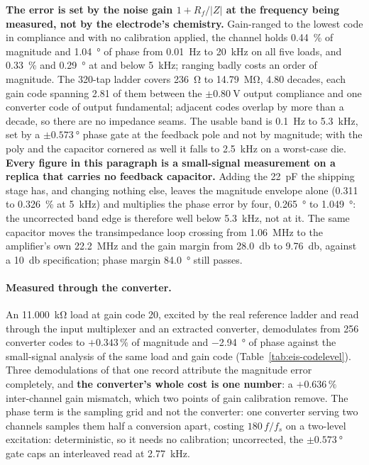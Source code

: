 \textbf{The error is set by the noise gain \(1 + R_f/|Z|\) at the frequency
being measured, not by the electrode's chemistry.} Gain-ranged to the lowest
code in compliance and with no calibration applied, the channel holds
\SI{0.44}{\percent} of magnitude and \SI{1.04}{\degree} of phase from
\SI{0.01}{\hertz} to \SI{20}{\kilo\hertz} on all five loads, and
\SI{0.33}{\percent} and \SI{0.29}{\degree} at and below \SI{5}{\kilo\hertz};
ranging badly costs an order of magnitude. The
320-tap ladder covers \SI{236}{\ohm} to \SI{14.79}{\mega\ohm}, \num{4.80}
decades, each gain code spanning \num{2.81} of them between the
\(\pm\SI{0.80}{\volt}\) output compliance and one converter code of output
fundamental; adjacent codes overlap by more than a decade, so there are no
impedance seams. The usable band is \SI{0.1}{\hertz} to \SI{5.3}{\kilo\hertz},
set by a \(\pm\SI{0.573}{\degree}\) phase gate at the feedback pole and not by
magnitude; with the poly and the capacitor cornered as well it falls to
\SI{2.5}{\kilo\hertz} on a worst-case die. \textbf{Every figure in this
paragraph is a small-signal measurement on a replica that carries no feedback
capacitor.} Adding the \SI{22}{\pico\farad} the shipping stage has, and
changing nothing else, leaves the magnitude envelope alone
(\num{0.311} to \SI{0.326}{\percent} at \SI{5}{\kilo\hertz}) and multiplies
the phase error by four, \SI{0.265}{\degree} to \SI{1.049}{\degree}: the
uncorrected band edge is therefore well below \SI{5.3}{\kilo\hertz}, not at
it. The same capacitor moves the transimpedance loop crossing from
\SI{1.06}{\mega\hertz} to the amplifier's own \SI{22.2}{\mega\hertz} and the
gain margin from \SI{28.0}{\decibel} to \SI{9.76}{\decibel}, against a
\SI{10}{\decibel} specification; phase margin \SI{84.0}{\degree} still
passes.

\paragraph{Measured through the converter.} An \SI{11.000}{\kilo\ohm} load at
gain code 20, excited by the real reference ladder and read through the input
multiplexer and an extracted converter, demodulates from \num{256} converter
codes to \(+0.343\,\%\) of magnitude and \SI{-2.94}{\degree} of phase against
the small-signal analysis of the same load and gain code
(Table~\ref{tab:eis-codelevel}). Three demodulations of that one record
attribute the magnitude error completely, and \textbf{the converter's whole cost
is one number}: a \(+0.636\,\%\) inter-channel gain mismatch, which two points
of gain calibration remove. The phase term is the sampling grid and not the
converter: one converter serving two channels samples them half a conversion
apart, costing \(180\,f/f_s\) on a two-level excitation: deterministic, so it
needs no calibration;
uncorrected, the \(\pm\SI{0.573}{\degree}\) gate caps an interleaved read at
\SI{2.77}{\kilo\hertz}.

